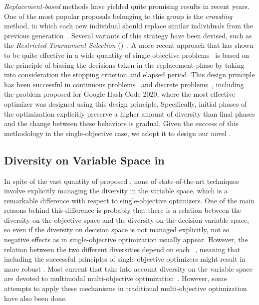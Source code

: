 \textit{Replacement-based} methods have yielded quite promising results in recent years.
%
One of the most popular proposals belonging to this group is the \textit{crowding} method, 
in which each new individual should replace similar individuals from the previous generation~\cite{mengshoel2014adaptive}.
%
Several variants of this strategy have been devised, such as the \textit{Restricted Tournament Selection} 
(\RTS{})~\cite{harik1995finding}.
%
A more recent approach that has shown to be quite effective in a wide quantity of single-objective problems~\cite{segura2016improving}
is based on the principle of biasing the decisions taken in the replacement phase by taking into consideration the 
stopping criterion and elapsed period.
%
This design principle has been successful in continuous problems~\cite{castillo2019differential} and discrete 
problems~\cite{segura2016improving,romero2018memetic}, including the problem proposed for Google Hash Code 2020, where the most
effective optimizer was designed using this design principle.
%
Specifically, initial phases of the optimization explicitly preserve a higher amount of diversity than final phases and the
change between these behaviors is gradual.
%
Given the success of this methodology in the single-objective case, we adopt it to design our novel \MOEA{}.


\subsection{Diversity on Variable Space in \MOEAS{}}\label{MOEAs:Diversity}

In spite of the vast quantity of proposed \MOEAS{}, none of state-of-the-art techniques involve
explicitly managing the diversity in the variable space, which is a remarkable difference with respect
to single-objective optimizers.
%
One of the main reasons behind this difference is probably that there is a relation between the diversity on the objective 
space and the diversity on the decision variable space, so even if the diversity on decision space is not managed explicitly,
not so negative effects as in single-objective optimization usually appear.
%
%
However, the relation between the two different diversities depend on each \MOP{}~\cite{shir2009enhancing}, meaning
that including the successful principles of single-objective optimizers might result in more robust \MOEAS{}.
%
Most current \MOEAS{} that take into account diversity on the variable space are devoted to multimodal 
multi-objective optimization~\cite{deb2008omni, cuate2019variation}.
%
However, some attempts to apply these mechanisms in traditional multi-objective optimization have also been done.


